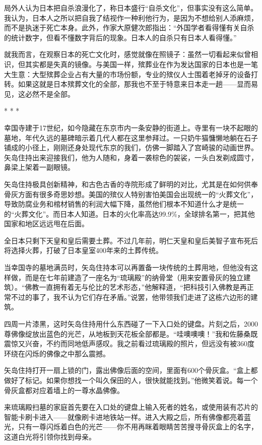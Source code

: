 \documentclass[12pt,oneside]{book}
\begin{document}
局外人认为日本把自杀浪漫化了，称日本盛行“自杀文化”，但事实没有这么简单。我认为，日本人之所以把自我了结视作一种利他行为，是因为不想给别人添麻烦，而不是执迷于死亡本身。此外，作家大原健次郎指出：“外国学者看得懂有关自杀的统计数字，但看不懂数字背后的现象。日本人的自杀只有日本人看得懂。”

就我而言，在观察日本的死亡文化时，感觉就像在照镜子：虽然一切看起来似曾相识，但其实都是失真的镜像。与美国一样，殡葬业在作为发达国家的日本也是一笔大生意：大型殡葬企业占有大量的市场份额，专业的殡仪人士围着老掉牙的设备打转。如果这就是日本殡葬文化的全部，那我也不至于特意来日本走一趟——显而易见，这必然不是全部。

\begin{center}
* * *
\end{center}

幸国寺建于17世纪，如今隐藏在东京市内一条安静的街道上。寺里有一块不起眼的墓地，年代久远的墓碑暗示着几代人都在这里参拜过。一只奶牛猫慵懒地躺在石子铺成的小径上，刚刚还身处现代东京的我们，仿佛一脚踏入了宫崎骏的动画世界。矢岛住持出来迎接我们，他为人随和，身着一袭棕色的袈裟，一头白发剃成圆寸，鼻梁上架着一副眼镜。

矢岛住持极具创新精神，和古色古香的寺院形成了鲜明的对比，尤其是在如何供奉骨灰方面有很多奇思妙想。美国的殡仪人特别害怕美国会出现统一的“火葬文化”，导致防腐业务和棺材销售的利润大幅下降，虽然他们根本不知道什么才是统一的“火葬文化”。而日本人知道。日本的火化率高达99.9\%，全球排名第一，把其他国家和地区远远甩在后面。

全日本只剩下天皇和皇后需要土葬。不过几年前，明仁天皇和皇后美智子宣布死后将选择火葬，打破了日本皇室400年来的土葬传统。

当幸国寺的墓地满员时，矢岛住持本可以再置备一块传统的土葬用地，但他没有这样做，而是在七年前建造了一座名为“琉璃殿”的纳骨堂（用来安置骨灰的独立建筑）。“佛教一直拥有着无与伦比的艺术形态，”他解释道，“把科技引入佛教是再正常不过的事了，我不认为它们存在矛盾。”说罢，他带领我们走进了这栋六边形的建筑。

四周一片漆黑，这时矢岛住持用什么东西碰了一下入口处的键盘。片刻之后，2000尊佛像绽放出蓝色的光芒，从地板到天花板全部都是。“哇噢噢噢！”我和佐藤桑既震惊又兴奋，不约而同地低声感叹。我之前看过琉璃殿的照片，但远没有被360度环绕在闪烁的佛像之中那么震撼。

矢岛住持打开一扇上锁的门，露出佛像后面的空间，里面有600个骨灰盒。“盒上都做好了标记。如果你想找一个叫久保田的人，很快就能找到。”他微笑着说。每一个骨灰盒都对应着墙上的一尊水晶佛像。

来琉璃殿扫墓的家庭首先要在入口处的键盘上输入死者的姓名，或使用装有芯片的智能卡刷卡进入——就像刷卡进地铁站一样。进入大殿之后，所有佛像都亮着蓝光，只有一尊闪烁着白色的光芒——你不用再眯着眼睛苦苦搜寻骨灰盒上的名字，这道白光将引领你找到母亲。
\end{document}
